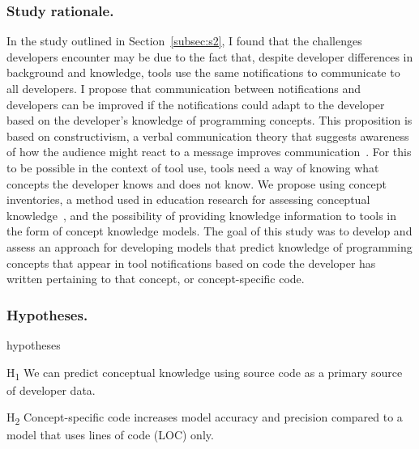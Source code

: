 \documentclass{llncs}
\begin{document}
\subsubsection{Study rationale.}
In the study outlined in Section~\ref{subsec:s2}, I found that the challenges developers encounter may be due to the fact that, despite developer differences in background and knowledge, tools use the same notifications to communicate to all developers. 
I propose that communication between notifications and developers can be improved if the notifications could adapt to the developer based on the developer's knowledge of programming concepts.
This proposition is based on constructivism, a verbal communication theory that suggests awareness of how the audience might react to a message improves communication~\cite{griffin2011first}. For this to be possible in the context of tool use, tools need a way of knowing what concepts the developer knows and does not know. 
We propose using concept inventories, a method used in education research for assessing conceptual knowledge~\cite{tew2010assessing}, and the possibility of providing knowledge information to tools in the form of concept knowledge models. 
The goal of this study was to develop and assess an approach for developing models that predict knowledge of programming concepts that appear in tool notifications based on code the developer has written pertaining to that concept, or concept-specific code. 

\subsubsection{Hypotheses.}

\begin{labeling}{hypotheses}
	\item [H\textsubscript{1}] We can predict conceptual knowledge using source code as a primary source of developer data.
	\item [H\textsubscript{2}] Concept-specific code increases model accuracy and precision compared to a model that uses lines of code (LOC) only.
\end{labeling}
\end{document}
